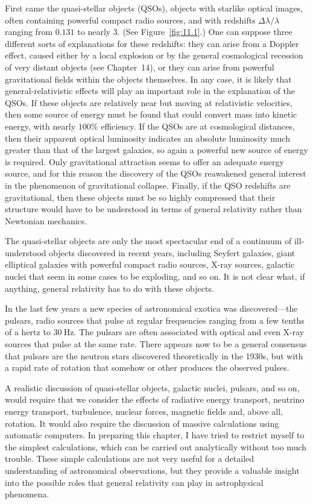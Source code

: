 First came the quasi-stellar objects (QSOs), objects with starlike optical
images, often containing powerful compact radio sources, and with redshifts
\(\Delta\lambda/\lambda\) ranging from \(0.131\) to nearly \(3\).
(See Figure~\ref{fig:11.1}.) One can suppose three different sorts of
explanations for these redshifts: they can arise from a Doppler effect, caused
either by a local explosion or by the general cosmological recession of very
distant objects (see Chapter~14), or they can arise from powerful
gravitational fields within the objects themselves. In any case, it is likely
that general-relativistic effects will play an important role in the
explanation of the QSOs. If these objects are relatively near but moving at
relativistic velocities, then some source of energy must be found that could
convert mass into kinetic energy, with nearly \(100\%\) efficiency. If the
QSOs are at cosmological distances, then their apparent optical luminosity
indicates an absolute luminosity much greater than that of the largest
galaxies, so again a powerful new source of energy is required. Only
gravitational attraction seems to offer an adequate energy source, and for
this reason the discovery of the QSOs reawakened general interest in the
phenomenon of gravitational collapse. Finally, if the QSO redshifts are
gravitational, then these objects must be so highly compressed that their
structure would have to be understood in terms of general relativity rather
than Newtonian mechanics.



The quasi-stellar objects are only the most spectacular end of a continuum of
ill-understood objects discovered in recent years, including Seyfert galaxies,
giant elliptical galaxies with powerful compact radio sources, X-ray sources,
galactic nuclei that seem in some cases to be exploding, and so on. It is not
clear what, if anything, general relativity has to do with these objects.

In the last few years a new species of astronomical exotica was
discovered---the pulsars, radio sources that pulse at regular frequencies
ranging from a few tenths of a hertz to \(30\ \mathrm{Hz}\). The pulsars are
often associated with optical and even X-ray sources that pulse at the same
rate. There appears now to be a general consensus that pulsars are the neutron
stars discovered theoretically in the 1930s, but with a rapid rate of rotation
that somehow or other produces the observed pulses.

A realistic discussion of quasi-stellar objects, galactic nuclei, pulsars,
and so on, would require that we consider the effects of radiative energy
transport, neutrino energy transport, turbulence, nuclear forces, magnetic
fields and, above all, rotation. It would also require the discussion of
massive calculations using automatic computers. In preparing this chapter, I
have tried to restrict myself to the simplest calculations, which can be
carried out analytically without too much trouble. These simple calculations
are not very useful for a detailed understanding of astronomical
observations, but they provide a valuable insight into the possible roles that
general relativity can play in astrophysical phenomena.
